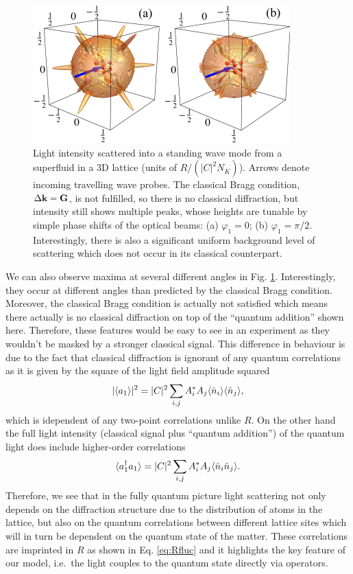 \begin{figure}[htbp!]
  \centering
  \includegraphics[width=\linewidth]{Ep1}
  \caption[Light Scattering Angular Distribution]{Light intensity
    scattered into a standing wave mode from a superfluid in a 3D
    lattice (units of $R/(|C|^2N_K)$). Arrows denote incoming
    travelling wave probes. The classical Bragg condition,
    $\Delta \mathbf{k} = \mathbf{G}$, is not fulfilled, so there is no classical
    diffraction, but intensity still shows multiple peaks, whose
    heights are tunable by simple phase shifts of the optical beams:
    (a) $\varphi_1=0$; (b) $\varphi_1=\pi/2$. Interestingly, there is
    also a significant uniform background level of scattering which
    does not occur in its classical counterpart. }
  \label{fig:scattering}
\end{figure}

We can also observe maxima at several different angles in
Fig. \ref{fig:scattering}. Interestingly, they occur at different
angles than predicted by the classical Bragg condition. Moreover, the
classical Bragg condition is actually not satisfied which means there
actually is no classical diffraction on top of the ``quantum
addition'' shown here. Therefore, these features would be easy to see
in an experiment as they wouldn't be masked by a stronger classical
signal.  This difference in behaviour is due to the fact that
classical diffraction is ignorant of any quantum correlations as it is
given by the square of the light field amplitude squared
\begin{equation}
  |\langle a_1 \rangle|^2 = |C|^2 \sum_{i,j} A_i^*
  A_j \langle \hat{n}_i \rangle \langle \hat{n}_j \rangle,
\end{equation}
which is idependent of any two-point correlations unlike $R$. On the
other hand the full light intensity (classical signal plus ``quantum
addition'') of the quantum light does include higher-order
correlations
\begin{equation}
  \langle a^\dagger_1 a_1 \rangle = |C|^2 \sum_{i,j} A_i^*
  A_j \langle \hat{n}_i \hat{n}_j \rangle.
\end{equation}
Therefore, we see that in the fully quantum picture light scattering
not only depends on the diffraction structure due to the distribution
of atoms in the lattice, but also on the quantum correlations between
different lattice sites which will in turn be dependent on the quantum
state of the matter. These correlations are imprinted in $R$ as shown
in Eq. \eqref{eq:Rfluc} and it highlights the key feature of our
model, i.e.~the light couples to the quantum state directly via
operators.

